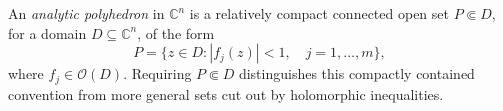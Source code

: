 
An \emph{analytic polyhedron} in $\mathbb C^n$ is a relatively compact connected open set $P\Subset D$, for a domain $D\subseteq\mathbb C^n$, of the form
\[
P=\{z\in D:|f_j(z)|<1,\quad j=1,\ldots,m\},
\]
where $f_j\in\mathcal O(D)$. Requiring $P\Subset D$ distinguishes this compactly contained convention from more general sets cut out by holomorphic inequalities.
